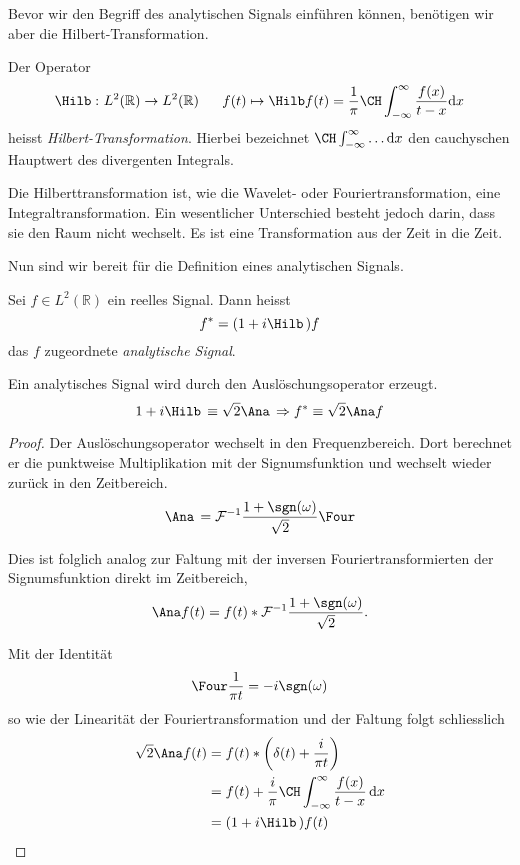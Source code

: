 Bevor wir den Begriff des analytischen Signals einführen können, benötigen wir aber die Hilbert-Transformation.
\begin{definition}
	Der Operator
 	\[
 	\Hilb\,\colon L^2(\mathbb R) \to L^2(\mathbb R)
 	~\quad~
 	f(t) \mapsto \Hilb f(t)
 	= \frac{1}{\pi} \CH\int_{-\infty}^{\infty}\frac{f(x)}{t-x} \mathrm{d}x
 	\]
 	heisst \emph{Hilbert-Transformation}.
 	Hierbei bezeichnet $\CH\int_{-\infty}^{\infty} \dots \mathrm{d}x$ den cauchyschen Hauptwert des divergenten Integrals.
%
%
\end{definition}

Die Hilberttransformation ist, wie die Wavelet- oder Fouriertransformation, eine Integraltransformation.
Ein wesentlicher Unterschied besteht jedoch darin, dass sie den Raum nicht wechselt.
Es ist eine Transformation aus der Zeit in die Zeit.

Nun sind wir bereit für die Definition eines analytischen Signals.
\begin{definition}
	\label{complex:analytic-signal}
	Sei $f \in L^2(\mathbb R)$ ein reelles Signal.
	Dann heisst
	\[f^\ast = (1 + i\Hilb\,)f \]
	das $f$ zugeordnete \emph{analytische Signal}.
\end{definition}
\begin{satz}
	Ein analytisches Signal wird durch den Auslöschungsoperator erzeugt.
	\[1 + i\Hilb\, \equiv \sqrt 2 \Ana\, \Rightarrow f^\ast \equiv \sqrt 2 \Ana f\]
\end{satz}

\begin{proof}
	Der Auslöschungsoperator wechselt in den Frequenzbereich.
	Dort berechnet er die punktweise Multiplikation mit der Signumsfunktion und wechselt wieder zurück in den Zeitbereich.
	\[\Ana\, = \mathcal{F}^{-1}\frac{1+\sgn(\omega)}{\sqrt 2}\Four\]
	
	Dies ist folglich analog zur Faltung mit der inversen Fouriertransformierten der Signumsfunktion direkt im Zeitbereich,
	\[ \Ana f(t) = f(t) * \mathcal{F}^{-1}\frac{1 + \sgn(\omega)}{\sqrt 2}. \]
	
	Mit der Identität
	\[\Four\frac{1}{\pi t} = -i\sgn(\omega)\]
	so wie der Linearität der Fouriertransformation und der Faltung folgt schliesslich
	\begin{align*}
		\sqrt 2 \Ana f(t) 
		&= f(t) * \biggl(\delta(t) + \frac{i}{\pi t} \biggr)\\
		&= f(t) + \frac{i}{\pi} \CH\int_{-\infty}^{\infty} \frac{f(x)}{t - x} \,\mathrm{d}x\\
		&= (1 + i\Hilb\,) f(t)\qedhere
	\end{align*}
\end{proof}

